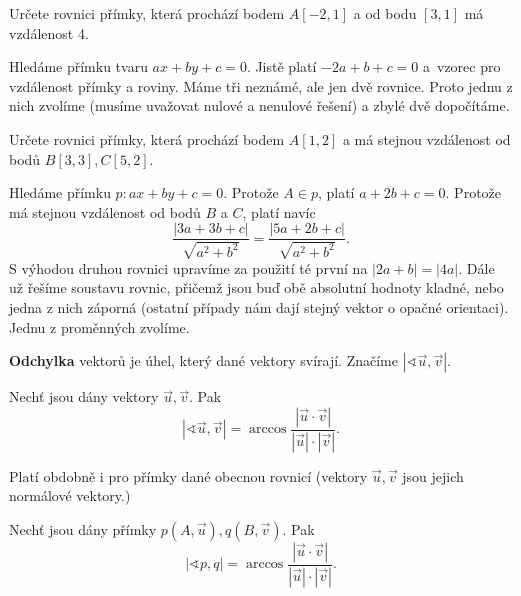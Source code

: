 \begin{priklad}
Určete rovnici přímky, která prochází bodem $A[-2,1]$ a od bodu $[3,1]$ má vzdálenost 4.
\end{priklad}

\begin{reseni}
Hledáme přímku tvaru $ax+by+c=0$. Jistě platí $-2a+b+c=0$ a~vzorec pro vzdálenost přímky a roviny.
Máme tři neznámé, ale jen dvě rovnice. Proto jednu z nich zvolíme (musíme uvažovat
nulové a nenulové řešení) a zbylé dvě dopočítáme.
\end{reseni}

\begin{priklad}
Určete rovnici přímky, která prochází bodem $A[1,2]$ a má stejnou vzdálenost od bodů
$B[3,3], C[5,2].$
\end{priklad}

\begin{reseni}
    Hledáme přímku $p: ax+by+c=0$. Protože $A\in p$, platí $a+2b+c=0$. Protože má stejnou vzdálenost od bodů $B$ a $C$, platí navíc
    $$\frac{|3a+3b+c|}{\sqrt{a^2+b^2} }=\frac{|5a+2b+c|}{\sqrt{a^2+b^2} }.$$
    S výhodou druhou rovnici upravíme za použití té první na
    $|2a+b|=|4a|$. Dále už řešíme soustavu rovnic, přičemž jsou buď obě absolutní hodnoty kladné, nebo jedna z nich záporná (ostatní případy
    nám dají stejný vektor o opačné orientaci). Jednu z proměnných zvolíme.
\end{reseni}

\begin{definition}
    \textbf{Odchylka} vektorů je úhel, který dané vektory svírají. Značíme $|\sphericalangle \vec u, \vec v|.$
\end{definition}

\begin{veta}
    Nechť jsou dány vektory $\vec u, \vec v.$ Pak
    $$|\sphericalangle \vec u, \vec v|=\arccos \frac{|\vec u \cdot \vec v|}{|\vec u|\cdot |\vec v|}.$$
\end{veta}

\begin{pozn}
    Platí obdobně i pro přímky dané obecnou rovnicí (vektory $\vec u, \vec v$ jsou
    jejich normálové vektory.)
\end{pozn}

\begin{veta}
    Nechť jsou dány přímky $p(A,\vec u), q(B, \vec v).$ Pak
    $$|\sphericalangle p, q|=\arccos \frac{|\vec u \cdot \vec v|}{|\vec u|\cdot |\vec v|}.$$
\end{veta}

